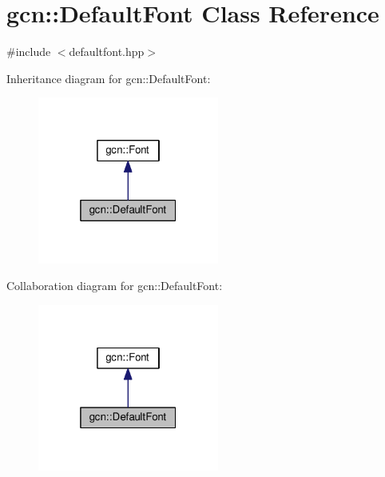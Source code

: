 \hypertarget{classgcn_1_1DefaultFont}{}\section{gcn\+:\+:Default\+Font Class Reference}
\label{classgcn_1_1DefaultFont}


{\ttfamily \#include $<$defaultfont.\+hpp$>$}



Inheritance diagram for gcn\+:\+:Default\+Font\+:\nopagebreak
\begin{figure}[H]
\begin{center}
\leavevmode
\includegraphics[width=169pt]{classgcn_1_1DefaultFont__inherit__graph}
\end{center}
\end{figure}


Collaboration diagram for gcn\+:\+:Default\+Font\+:\nopagebreak
\begin{figure}[H]
\begin{center}
\leavevmode
\includegraphics[width=169pt]{classgcn_1_1DefaultFont__coll__graph}
\end{center}
\end{figure}
